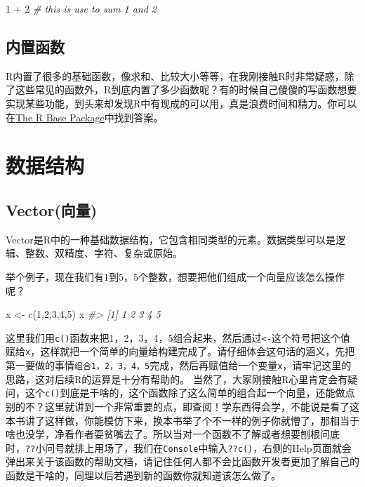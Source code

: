 \documentclass[
]{book}
\newenvironment{Shaded}{\begin{snugshade}}{\end{snugshade}}
\newcommand{\CommentTok}[1]{\textcolor[rgb]{0.56,0.35,0.01}{\textit{#1}}}
\newcommand{\DecValTok}[1]{\textcolor[rgb]{0.00,0.00,0.81}{#1}}
\newcommand{\FunctionTok}[1]{\textcolor[rgb]{0.00,0.00,0.00}{#1}}
\newcommand{\NormalTok}[1]{#1}
\newcommand{\OtherTok}[1]{\textcolor[rgb]{0.56,0.35,0.01}{#1}}
\newcommand{\SpecialCharTok}[1]{\textcolor[rgb]{0.00,0.00,0.00}{#1}}
\begin{document}
\begin{Shaded}
\begin{Highlighting}[]
\DecValTok{1} \SpecialCharTok{+} \DecValTok{2}    \CommentTok{\# this is use to sum 1 and 2}
\end{Highlighting}
\end{Shaded}

\hypertarget{ux5185ux7f6eux51fdux6570}{%
\section{内置函数}\label{ux5185ux7f6eux51fdux6570}}

R内置了很多的基础函数，像求和、比较大小等等，在我刚接触R时非常疑惑，除了这些常见的函数外，R到底内置了多少函数呢？有的时候自己傻傻的写函数想要实现某些功能，到头来却发现R中有现成的可以用，真是浪费时间和精力。你可以在\href{https://stat.ethz.ch/R-manual/R-devel/library/base/html/00Index.html}{The R Base Package}中找到答案。

\hypertarget{ux6570ux636eux7ed3ux6784}{%
\chapter{数据结构}\label{ux6570ux636eux7ed3ux6784}}

\hypertarget{vectorux5411ux91cf}{%
\section{Vector(向量)}\label{vectorux5411ux91cf}}

Vector是R中的一种基础数据结构，它包含相同类型的元素。数据类型可以是逻辑、整数、双精度、字符、复杂或原始。

举个例子，现在我们有1到5，5个整数，想要把他们组成一个向量应该怎么操作呢？

\begin{Shaded}
\begin{Highlighting}[]
\NormalTok{x }\OtherTok{\textless{}{-}} \FunctionTok{c}\NormalTok{(}\DecValTok{1}\NormalTok{,}\DecValTok{2}\NormalTok{,}\DecValTok{3}\NormalTok{,}\DecValTok{4}\NormalTok{,}\DecValTok{5}\NormalTok{)}
\NormalTok{x}
\CommentTok{\#\textgreater{} [1] 1 2 3 4 5}
\end{Highlighting}
\end{Shaded}

这里我们用\texttt{c()}函数来把1，2，3，4，5组合起来，然后通过\texttt{\textless{}-}这个符号把这个值赋给\texttt{x}，这样就把一个简单的向量给构建完成了。请仔细体会这句话的涵义，先把第一要做的事情\texttt{组合1，2，3，4，5}完成，然后再赋值给一个变量\texttt{x}，请牢记这里的思路，这对后续R的运算是十分有帮助的。
当然了，大家刚接触R心里肯定会有疑问，这个\texttt{c()}到底是干啥的，这个函数除了这么简单的组合起一个向量，还能做点别的不？这里就讲到一个非常重要的点，即查阅！学东西得会学，不能说是看了这本书讲了这样做，你能模仿下来，换本书举了个不一样的例子你就懵了，那相当于啥也没学，净看作者耍贫嘴去了。所以当对一个函数不了解或者想要刨根问底时，\texttt{??}小问号就排上用场了，我们在\texttt{Console}中输入\texttt{??c()}，右侧的Help页面就会弹出来关于该函数的帮助文档，请记住任何人都不会比函数开发者更加了解自己的函数是干啥的，同理以后若遇到新的函数你就知道该怎么做了。
\end{document}
